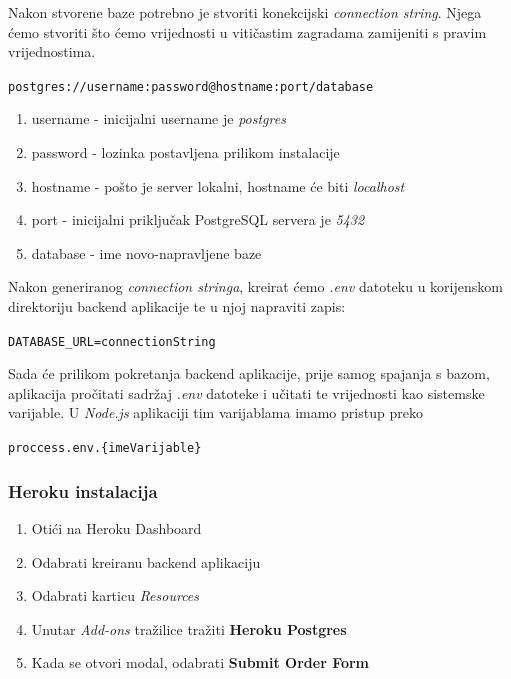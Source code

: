 								Nakon stvorene baze potrebno je stvoriti konekcijski \textit{connection string}. Njega ćemo stvoriti što ćemo vrijednosti u vitičastim zagradama zamijeniti s pravim vrijednostima.
								
								\begin{center}
										\texttt{postgres://{username}:{password}@{hostname}:{port}/{database}}
								\end{center}
								
								\begin{enumerate}
										\item username - inicijalni username je \textit{postgres}
										\item password - lozinka postavljena prilikom instalacije
										\item hostname - pošto je server lokalni, hostname će biti \textit{localhost}
										\item port - inicijalni priključak PostgreSQL servera je \textit{5432}
										\item database - ime novo-napravljene baze
								\end{enumerate}
								
								Nakon generiranog \textit{connection stringa}, kreirat ćemo \textit{.env} datoteku u korijenskom direktoriju backend aplikacije te u njoj napraviti zapis:

								\begin{center}
										\texttt{DATABASE\_URL={connectionString}}
								\end{center}
								
								Sada će prilikom pokretanja backend aplikacije, prije samog spajanja s bazom, aplikacija pročitati sadržaj \textit{.env} datoteke i učitati te vrijednosti kao sistemske varijable. U \textit{Node.js} aplikaciji tim varijablama imamo pristup preko

								\begin{center}
										\texttt{proccess.env.\{imeVarijable\}}
								\end{center}
				
				
						\subsubsection*{Heroku instalacija}
						
								\begin{enumerate}
										\item Otići na Heroku Dashboard
										\item Odabrati kreiranu backend aplikaciju
										\item Odabrati karticu \textit{Resources}
										\item Unutar \textit{Add-ons} tražilice tražiti \textbf{Heroku Postgres}
										\item Kada se otvori modal, odabrati \textbf{Submit Order Form}
								\end{enumerate}
								
